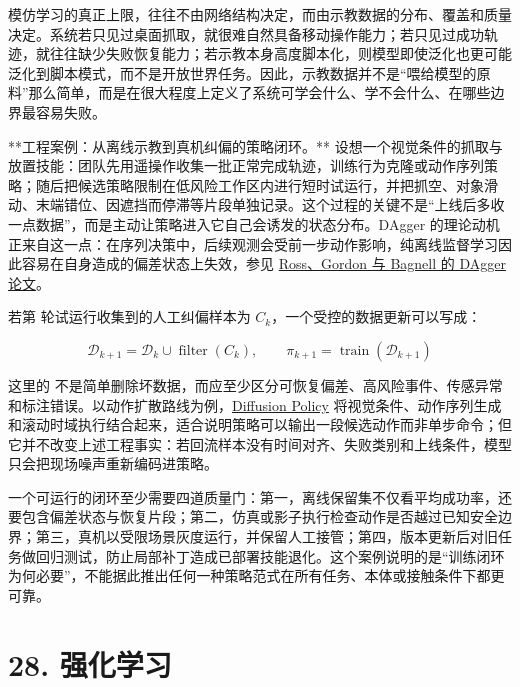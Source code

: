 模仿学习的真正上限，往往不由网络结构决定，而由示教数据的分布、覆盖和质量决定。系统若只见过桌面抓取，就很难自然具备移动操作能力；若只见过成功轨迹，就往往缺少失败恢复能力；若示教本身高度脚本化，则模型即使泛化也更可能泛化到脚本模式，而不是开放世界任务。因此，示教数据并不是“喂给模型的原料”那么简单，而是在很大程度上定义了系统可学会什么、学不会什么、在哪些边界最容易失败。

**工程案例：从离线示教到真机纠偏的策略闭环。** 设想一个视觉条件的抓取与放置技能：团队先用遥操作收集一批正常完成轨迹，训练行为克隆或动作序列策略；随后把候选策略限制在低风险工作区内进行短时试运行，并把抓空、对象滑动、末端错位、因遮挡而停滞等片段单独记录。这个过程的关键不是“上线后多收一点数据”，而是主动让策略进入它自己会诱发的状态分布。DAgger 的理论动机正来自这一点：在序列决策中，后续观测会受前一步动作影响，纯离线监督学习因此容易在自身造成的偏差状态上失效，参见 \href{https://proceedings.mlr.press/v15/ross11a.html}{Ross、Gordon 与 Bagnell 的 DAgger 论文}。

若第 \texttt{} 轮试运行收集到的人工纠偏样本为 \(C_k\)，一个受控的数据更新可以写成：

\begingroup
\scriptsize
\begin{equation*}
\mathcal{D}_{k+1} = \mathcal{D}_k \cup \operatorname{filter}(C_k),
\qquad \pi_{k+1} = \operatorname{train}(\mathcal{D}_{k+1})
\end{equation*}
\endgroup

这里的 \texttt{} 不是简单删除坏数据，而应至少区分可恢复偏差、高风险事件、传感异常和标注错误。以动作扩散路线为例，\href{https://www.roboticsproceedings.org/rss19/p026.pdf}{Diffusion Policy} 将视觉条件、动作序列生成和滚动时域执行结合起来，适合说明策略可以输出一段候选动作而非单步命令；但它并不改变上述工程事实：若回流样本没有时间对齐、失败类别和上线条件，模型只会把现场噪声重新编码进策略。

一个可运行的闭环至少需要四道质量门：第一，离线保留集不仅看平均成功率，还要包含偏差状态与恢复片段；第二，仿真或影子执行检查动作是否越过已知安全边界；第三，真机以受限场景灰度运行，并保留人工接管；第四，版本更新后对旧任务做回归测试，防止局部补丁造成已部署技能退化。这个案例说明的是“训练闭环为何必要”，不能据此推出任何一种策略范式在所有任务、本体或接触条件下都更可靠。

\chapter*{28. 强化学习}

